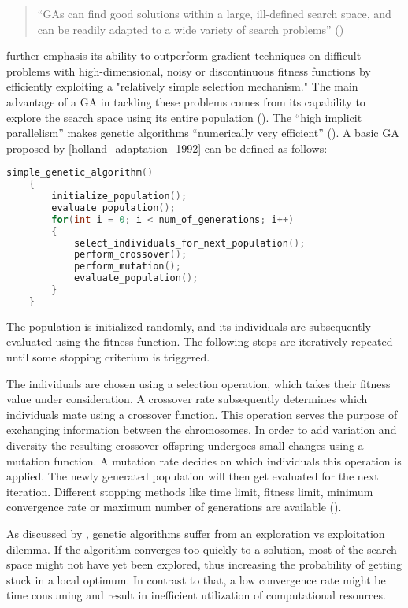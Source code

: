 \begin{quote}
	\begin{em}
		\enquote{GAs can find good solutions within a large, ill-defined search space, and can be readily adapted to a wide variety of search problems} (\cite{mills_determining_2015})
	\end{em}
\end{quote}

\cite{grefenstette_optimization_1986} further emphasis its ability to outperform gradient techniques on difficult problems with high-dimensional, noisy or discontinuous fitness functions by efficiently exploiting a "relatively simple selection mechanism." The main advantage of a GA in tackling these problems comes from its capability to explore the search space using its entire population (\cite{hussain_trade-off_2020}). The \enquote{high implicit parallelism} makes genetic algorithms \enquote{numerically very efficient} (\cite{marsili_libelli_adaptive_2000}). A basic GA proposed by \ref{holland_adaptation_1992} can be defined as follows:

\begin{lstlisting}[language=C, tabsize=4]
	simple_genetic_algorithm() 
	{
		initialize_population();
		evaluate_population();
		for(int i = 0; i < num_of_generations; i++) 
		{
			select_individuals_for_next_population();
			perform_crossover();
			perform_mutation();
			evaluate_population();
		}
	}
\end{lstlisting}

The population is initialized randomly, and its individuals are subsequently evaluated using the fitness function. The following steps are iteratively repeated until some stopping criterium is triggered. 

The individuals are chosen using a selection operation, which takes their fitness value under consideration. A crossover rate subsequently determines which individuals mate using a crossover function. This operation serves the purpose of exchanging information between the chromosomes. In order to add variation and diversity the resulting crossover offspring undergoes small changes using a mutation function. A mutation rate decides on which individuals this operation is applied. The newly generated population will then get evaluated for the next iteration. Different stopping methods like time limit, fitness limit, minimum convergence rate or maximum number of generations are available (\cite{majumdar_genetic_2015}).

As discussed by \cite{hussain_trade-off_2020}, genetic algorithms suffer from an exploration vs exploitation dilemma. If the algorithm converges too quickly to a solution, most of the search space might not have yet been explored, thus increasing the probability of getting stuck in a local optimum.
In contrast to that, a low convergence rate might be time consuming and result in inefficient utilization of computational resources.

